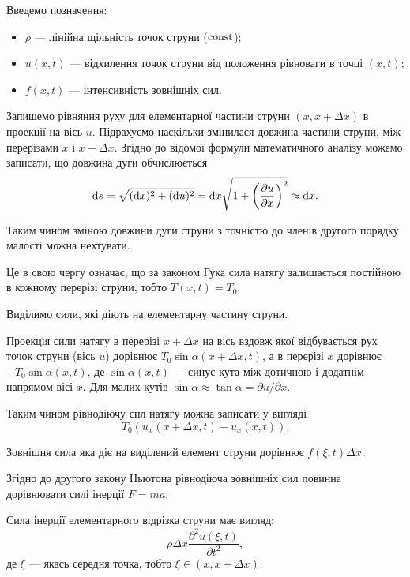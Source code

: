 Введемо позначення:
\begin{itemize}
	\item $\rho$ --- лінійна щільність точок струни ($\operatorname{const}$);
	\item $u(x, t)$ --- відхилення точок струни від положення рівноваги в точці $(x, t)$;
	\item $f(x, t)$ --- інтенсивність зовнішніх сил.
\end{itemize}

Запишемо рівняння руху для елементарної частини струни $(x, x + \Delta x)$ в проекції на вісь $u$. Підрахуємо наскільки змінилася довжина частини струни, між перерізами $x$ і $x + \Delta x$. Згідно до відомої формули математичного аналізу можемо записати, що довжина дуги обчислюється
\begin{equation}
	\mathop{}\!\mathrm{d} s = \sqrt{(\mathop{}\!\mathrm{d} x)^2 + (\mathop{}\!\mathrm{d} u)^2} = \mathop{}\!\mathrm{d} x \sqrt{1 + \left( \frac{\partial u}{\partial x} \right)^2} \approx \mathop{}\!\mathrm{d} x.
\end{equation}

Таким чином зміною довжини дуги струни з точністю до членів другого порядку малості можна нехтувати. \medskip

Це в свою чергу означає, що за законом Гука сила натягу залишається постійною в кожному перерізі струни, тобто $T(x, t) = T_0$. \medskip

Виділимо сили, які діють на елементарну частину струни. \medskip

Проекція сили натягу в перерізі $x + \Delta x$ на вісь вздовж якої відбувається рух точок струни (вісь $u$) дорівнює $T_0 \sin \alpha (x + \Delta x, t) $, а в перерізі $x$ дорівнює $-T_0 \sin \alpha(x, t)$, де $\sin \alpha(x, t)$ --- синус кута між дотичною і додатнім напрямом вісі $x$. Для малих кутів $\sin \alpha \approx \tan \alpha = \partial u / \partial x$. \medskip

Таким чином рівнодіючу сил натягу можна записати у вигляді
\begin{equation}
	T_0(u_x(x + \Delta x, t) - u_x(x, t)).
\end{equation}

Зовнішня сила яка діє на виділений елемент струни дорівнює $f(\xi, t) \Delta x$. \medskip

Згідно до другого закону Ньютона рівнодіюча зовнішніх сил повинна дорівнювати силі інерції $F = ma$. \medskip

Сила інерції елементарного відрізка струни має вигляд:
\begin{equation}
	\rho \Delta x \frac{\partial^2 u(\xi, t)}{\partial t^2},	
\end{equation}
де $\xi$ --- якась середня точка, тобто $\xi \in (x, x + \Delta x)$. \medskip


